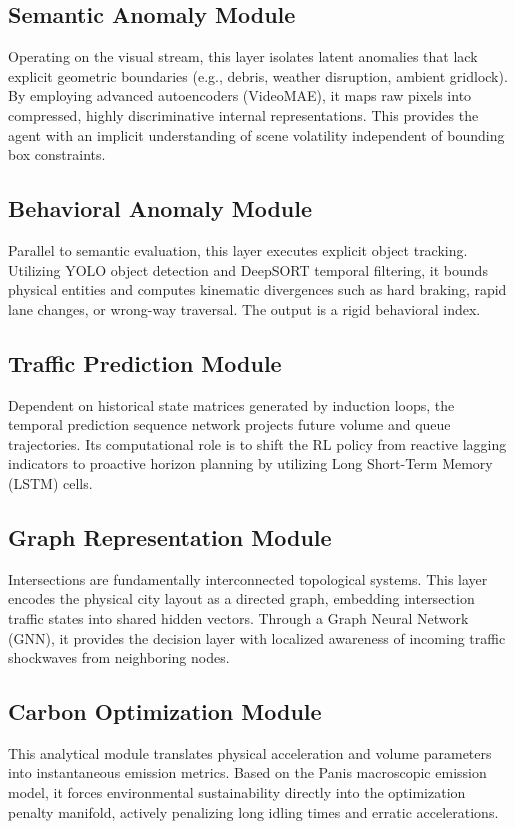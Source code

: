 \documentclass[journal]{IEEEtran}
\begin{document}
\subsection{Semantic Anomaly Module}
Operating on the visual stream, this layer isolates latent anomalies that lack explicit geometric boundaries (e.g., debris, weather disruption, ambient gridlock). By employing advanced autoencoders (VideoMAE), it maps raw pixels into compressed, highly discriminative internal representations. This provides the agent with an implicit understanding of scene volatility independent of bounding box constraints.

\subsection{Behavioral Anomaly Module}
Parallel to semantic evaluation, this layer executes explicit object tracking. Utilizing YOLO object detection and DeepSORT temporal filtering, it bounds physical entities and computes kinematic divergences such as hard braking, rapid lane changes, or wrong-way traversal. The output is a rigid behavioral index.

\subsection{Traffic Prediction Module}
Dependent on historical state matrices generated by induction loops, the temporal prediction sequence network projects future volume and queue trajectories. Its computational role is to shift the RL policy from reactive lagging indicators to proactive horizon planning by utilizing Long Short-Term Memory (LSTM) cells.

\subsection{Graph Representation Module}
Intersections are fundamentally interconnected topological systems. This layer encodes the physical city layout as a directed graph, embedding intersection traffic states into shared hidden vectors. Through a Graph Neural Network (GNN), it provides the decision layer with localized awareness of incoming traffic shockwaves from neighboring nodes.

\subsection{Carbon Optimization Module}
This analytical module translates physical acceleration and volume parameters into instantaneous emission metrics. Based on the Panis macroscopic emission model, it forces environmental sustainability directly into the optimization penalty manifold, actively penalizing long idling times and erratic accelerations.
\end{document}
